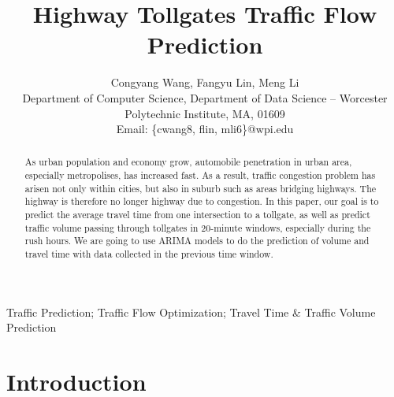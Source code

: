 \documentclass[journal, letterpaper]{IEEEtran}
\begin{document}
\title{Highway Tollgates Traffic Flow Prediction}
\author{Congyang Wang, Fangyu Lin, Meng Li \\ Department of Computer Science, Department of Data Science -- Worcester Polytechnic Institute, MA, 01609 \\ Email: \{cwang8, flin, mli6\}@wpi.edu}
\maketitle

\begin{abstract} 
\large
As urban population and economy grow, automobile penetration in urban area, especially metropolises, has increased fast. As a result, traffic congestion problem has arisen not only within cities, but also in suburb such as areas bridging highways. The highway is therefore no longer highway due to congestion. In this paper, our goal is to predict the average travel time from one intersection to a tollgate, as well as predict traffic volume passing through tollgates in 20-minute windows, especially during the rush hours. We are going to use ARIMA models to do the prediction of volume and travel time with data collected in the previous time window. 

\end{abstract}

\begin{IEEEkeywords}
Traffic Prediction;
Traffic Flow Optimization;
Travel Time \& Traffic Volume Prediction
\end{IEEEkeywords}

\section{Introduction}
\large
\end{document}
